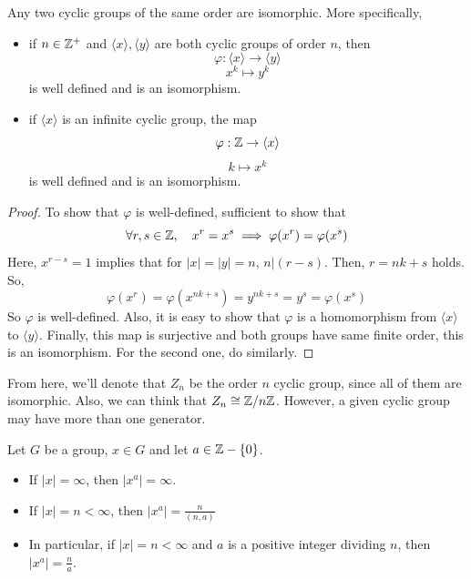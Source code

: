 \documentclass[12pt, a4paper, openany, twoside]{book}
\theoremstyle{definition}
\theoremstyle{remark}
\theoremstyle{plain}
\numberwithin{equation}{section}
\begin{document}
\begin{tcolorbox}[colback=yellow!10!white,colframe=red!75!black,title=Theorem]

Any two cyclic groups of the same order are isomorphic. More specifically, 
\begin{itemize}
    \item if $n \in {\mathbb {Z}}^+$ and $\langle x \rangle, \langle y \rangle$ are both cyclic groups of order $n$, then 
    \[\varphi: \langle x \rangle \rightarrow \langle y \rangle\]
    \[x^k \mapsto y^k\]
    is well defined and is an isomorphism. 
    \item if $\langle x \rangle$ is an infinite cyclic group, the map 
    \[\varphi: {\mathbb {Z}} \rightarrow \langle x \rangle\]
    \[k \mapsto x^k\]
    is well defined and is an isomorphism.
\end{itemize}

\end{tcolorbox}

\begin{proof}
    
To show that $\varphi$ is well-defined, sufficient to show that 
\[\forall r, s \in {\mathbb {Z}}, \quad x^r = x^s \implies \varphi(x^r) = \varphi(x^s)\]
Here, $x^{r-s} = 1$ implies that for $|x| = |y| = n$, $n | (r - s)$. Then, $r = nk + s$ holds. So, 
\[\varphi(x^{r}) = \varphi(x^{nk + s}) = y^{nk + s} = y^s = \varphi(x^s)\]
So $\varphi$ is well-defined. Also, it is easy to show that $\varphi$ is a homomorphism from $\langle x \rangle$ to $\langle y \rangle$. 
Finally, this map is surjective and both groups have same finite order, this is an isomorphism. For the second one, do similarly. 

\end{proof}

From here, we'll denote that $Z_n$ be the order $n$ cyclic group, since all of them are isomorphic. 
Also, we can think that $Z_n \cong {\mathbb {Z}} / n{\mathbb {Z}}$. However, a given cyclic group may have more than one generator. 

\begin{tcolorbox}[colback=yellow!10!white,colframe=green!75!black,title=Proposition]

Let $G$ be a group, $x \in G$ and let $a \in {\mathbb {Z}} - \{0\}$. 

\begin{itemize}
    \item If $|x| = \infty$, then $|x^a| = \infty$. 
    \item If $|x| = n < \infty$, then $|x^a| = \frac{n}{(n, a)}$
    \item In particular, if $|x| = n < \infty$ and $a$ is a positive integer dividing $n$, then $|x^a| = \frac{n}{a}$.  
\end{itemize}

\end{tcolorbox}
\end{document}
